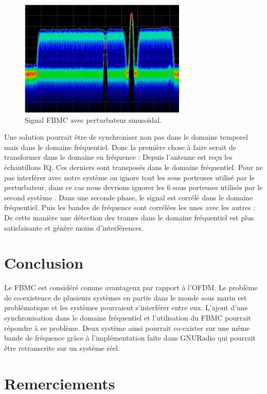 \documentclass[conference]{IEEEtran}
\begin{document}
\begin{figure}[htbp]
\centerline{\includegraphics{Resultats.png}}
\caption{Signal FBMC avec perturbateur sinusoïdal.}
\label{Resultats}
\end{figure}


 
Une solution pourrait être de synchroniser non pas dans le domaine temporel mais dans le domaine fréquentiel. Donc la première chose à faire serait de transformer dans le domaine en fréquence : Depuis l’antenne est reçu les échantillons IQ. Ces derniers sont transposés dans le domaine fréquentiel. Pour ne pas interférer avec notre système on ignore tout les sous porteuses utilisé par le perturbateur, dans ce cas nous devrions ignorer les 6 sous porteuses utilisés par le second système . Dans une seconde phase, le signal est corrélé dans le domaine fréquentiel. Puis les bandes de fréquence sont corrélées les unes avec les autres : De cette manière une détection des trames dans le domaine fréquentiel est plus satisfaisante et génère moins d'interférences.

\section{Conclusion}

Le FBMC est considéré comme avantageux par rapport à l'OFDM. Le problème de co-existence de plusieurs systèmes en partie dans le monde sous marin est problématique et les systèmes pourraient s'interférer entre eux. L'ajout d'une synchronisation dans le domaine fréquentiel et l'utilisation du FBMC pourrait répondre à ce problème. Deux système ainsi pourrait co-exister sur une même bande de fréquence grâce à l'implémentation faite dans GNURadio qui pourrait être retranscrite sur un système réel.

\section*{Remerciements}
\end{document}
